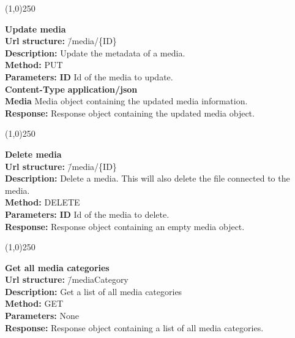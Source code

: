 \documentclass[11pt]{article}
\begin{document}
\begin{center}\line(1,0){250}\end{center}

\begin{tabbing}
\textbf{Update media} \\
\textcolor{black!60}{\textbf{Url structure:}} \hspace{0.2in} \= /media/\{ID\} \\
\textcolor{black!60}{\textbf{Description:}}  \> Update the metadata of a media. \\
\textcolor{black!60}{\textbf{Method:}} \> PUT \\
\textcolor{black!60}{\textbf{Parameters:}} \> \textbf{ID} Id of the media to update. \\
\textcolor{black!60}{\textbf{Content-Type}} \> \textbf{application/json} \\
\> \textbf{Media} Media object containing the updated media information. \\
\textcolor{black!60}{\textbf{Response:}} \> Response object containing the updated media object.
\end{tabbing}

\begin{center}\line(1,0){250}\end{center}

\begin{tabbing}
\textbf{Delete media} \\
\textcolor{black!60}{\textbf{Url structure:}} \hspace{0.2in} \= /media/\{ID\} \\
\textcolor{black!60}{\textbf{Description:}}  \> Delete a media. This will also delete the file connected to the media. \\
\textcolor{black!60}{\textbf{Method:}} \> DELETE \\
\textcolor{black!60}{\textbf{Parameters:}} \> \textbf{ID} Id of the media to delete. \\
\textcolor{black!60}{\textbf{Response:}} \> Response object containing an empty media object.
\end{tabbing}

\begin{center}\line(1,0){250}\end{center}

\begin{tabbing}
\textbf{Get all media categories} \\
\textcolor{black!60}{\textbf{Url structure:}} \hspace{0.2in} \= /mediaCategory \\
\textcolor{black!60}{\textbf{Description:}}  \> Get a list of all media categories \\
\textcolor{black!60}{\textbf{Method:}} \> GET \\
\textcolor{black!60}{\textbf{Parameters:}} \> None \\
\textcolor{black!60}{\textbf{Response:}} \> Response object containing a list of all media categories.
\end{tabbing}
\end{document}
